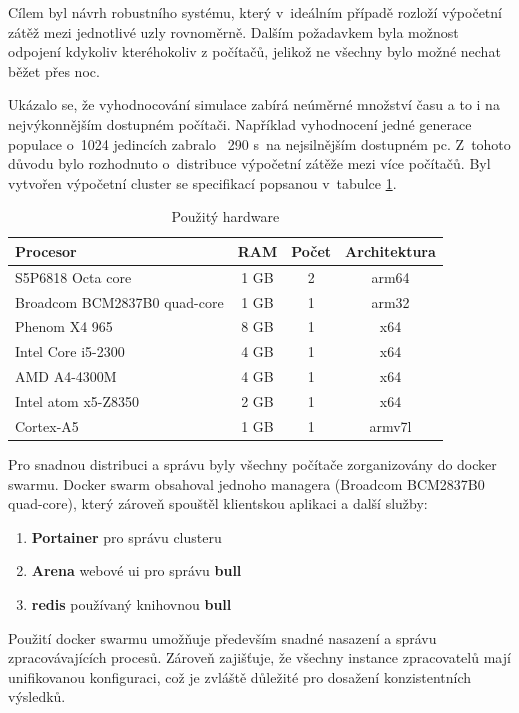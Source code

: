 Cílem byl návrh robustního systému, který v~ideálním případě rozloží výpočetní zátěž mezi jednotlivé uzly rovnoměrně. Dalším požadavkem byla možnost odpojení kdykoliv kteréhokoliv z počítačů, jelikož ne všechny bylo možné nechat běžet přes noc.

\label{sec:cluster}
Ukázalo se, že vyhodnocování simulace zabírá neúměrné množství času a to i na nejvýkonnějším dostupném počítači. 
Například vyhodnocení jedné generace populace o~1024 jedincích zabralo ~290 s~na nejsilnějším dostupném pc. Z~tohoto důvodu bylo rozhodnuto o~distribuce výpočetní zátěže mezi více počítačů. Byl vytvořen výpočetní cluster se specifikací popsanou v~tabulce \ref{table:hw_table}.
\begin{table}[h!]
	\centering
	\begin{tabular}{|l|c|c|c|}
		\hline 
		Procesor & RAM & Počet & Architektura\\ 
		\hline 
		S5P6818 Octa core & 1 GB & 2 & arm64 \\ 
		\hline 
		Broadcom BCM2837B0 quad-core & 1 GB & 1 & arm32 \\ 
		\hline 
		Phenom X4 965 & 8 GB & 1 & x64 \\ 
		\hline
		Intel Core i5-2300 & 4 GB & 1 & x64 \\ 
		\hline
		AMD A4-4300M & 4 GB & 1 & x64 \\ 
		\hline 
		Intel atom x5-Z8350 & 2 GB & 1 & x64 \\ 
		\hline
		Cortex-A5 & 1 GB & 1 & armv7l \\
		\hline
	\end{tabular} 
	\caption{Použitý hardware}
	\label{table:hw_table}
\end{table}

Pro snadnou distribuci a správu byly všechny počítače zorganizovány do docker swarmu. Docker swarm obsahoval jednoho managera (Broadcom BCM2837B0 quad-core), který zároveň spouštěl klientskou aplikaci a další služby:

\begin{enumerate}
	\item \textbf{Portainer} pro správu clusteru
	\item \textbf{Arena} webové ui pro správu \textbf{bull}
	\item \textbf{redis} používaný knihovnou \textbf{bull}
\end{enumerate}

Použití docker swarmu umožňuje především snadné nasazení a správu zpracovávajících procesů. Zároveň zajišťuje, že všechny instance zpracovatelů mají unifikovanou konfiguraci, což je zvláště důležité pro dosažení konzistentních výsledků.


